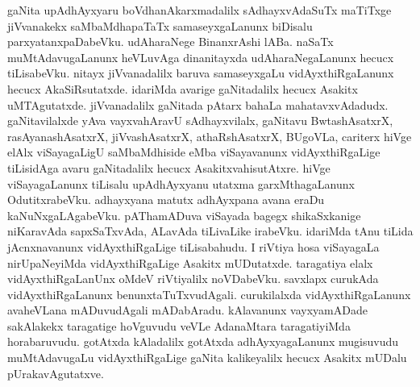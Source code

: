 gaNita upAdhAyxyaru boVdhanAkarxmadalilx sAdhayxvAdaSuTx maTiTxge jiVvanakekx saMbaMdhapaTaTx samaseyxgaLanunx biDisalu parxyatanxpaDabeVku. udAharaNege BinanxrAshi lABa. naSaTx muMtAdavugaLanunx heVLuvAga dinanitayxda udAharaNegaLanunx hecucx tiLisabeVku. nitayx jiVvanadalilx baruva samaseyxgaLu vidAyxthiRgaLanunx hecucx AkaSiRsutatxde. idariMda avarige gaNitadalilx hecucx Asakitx uMTAgutatxde. jiVvanadalilx gaNitada pAtarx bahaLa mahatavxvAdadudx. gaNitavilalxde yAva vayxvahAravU sAdhayxvilalx, gaNitavu BwtashAsatxrX, rasAyanashAsatxrX, jiVvashAsatxrX, athaRshAsatxrX, BUgoVLa, cariterx hiVge elAlx viSayagaLigU saMbaMdhiside eMba viSayavanunx vidAyxthiRgaLige tiLisidAga avaru gaNitadalilx hecucx AsakitxvahisutAtxre. hiVge viSayagaLanunx tiLisalu upAdhAyxyanu utatxma garxMthagaLanunx OdutitxrabeVku. adhayxyana matutx adhAyxpana avana eraDu kaNuNxgaLAgabeVku. pAThamADuva viSayada bagegx shikaSxkanige niKaravAda sapxSaTxvAda, ALavAda tiLivaLike irabeVku. idariMda tAnu tiLida jAcnxnavanunx vidAyxthiRgaLige tiLisabahudu. I riVtiya hosa viSayagaLa nirUpaNeyiMda vidAyxthiRgaLige Asakitx mUDutatxde. taragatiya elalx vidAyxthiRgaLanUnx oMdeV riVtiyalilx noVDabeVku. savxlapx curukAda vidAyxthiRgaLanunx benunxtaTuTxvudAgali. curukilalxda vidAyxthiRgaLanunx avaheVLana mADuvudAgali mADabAradu. kAlavanunx vayxyamADade sakAlakekx taragatige hoVguvudu veVLe AdanaMtara taragatiyiMda horabaruvudu. gotAtxda kAladalilx gotAtxda adhAyxyagaLanunx mugisuvudu muMtAdavugaLu vidAyxthiRgaLige gaNita kalikeyalilx hecucx Asakitx mUDalu pUrakavAgutatxve.

